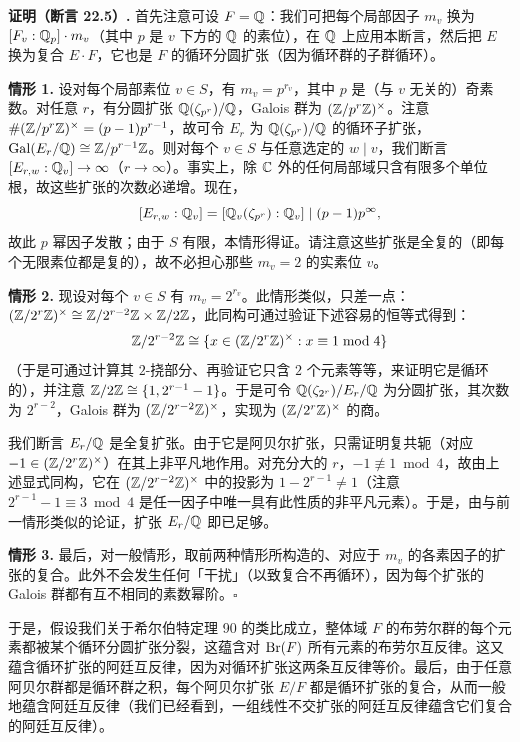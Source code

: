 \textbf{证明（断言 22.5）.} 首先注意可设 $F=\mathbb{Q}$：我们可把每个局部因子 $m_v$ 换为 $[F_v:\mathbb{Q}_p]\cdot m_v$（其中 $p$ 是 $v$ 下方的 $\mathbb{Q}$ 的素位），在 $\mathbb{Q}$ 上应用本断言，然后把 $E$ 换为复合 $E\cdot F$，它也是 $F$ 的循环分圆扩张（因为循环群的子群循环）。

\textbf{情形 1.} 设对每个局部素位 $v\in S$，有 $m_v=p^{r_v}$，其中 $p$ 是（与 $v$ 无关的）奇素数。对任意 $r$，有分圆扩张 $\mathbb{Q}(\zeta_{p^r})/\mathbb{Q}$，Galois 群为 $(\mathbb{Z}/p^r\mathbb{Z})^\times$。注意 $\#(\mathbb{Z}/p^r\mathbb{Z})^\times=(p-1)p^{r-1}$，故可令 $E_r$ 为 $\mathbb{Q}(\zeta_{p^r})/\mathbb{Q}$ 的循环子扩张，$\operatorname{Gal}(E_r/\mathbb{Q})\cong\mathbb{Z}/p^{r-1}\mathbb{Z}$。则对每个 $v\in S$ 与任意选定的 $w\mid v$，我们断言 $[E_{r,w}:\mathbb{Q}_v]\to\infty$（$r\to\infty$）。事实上，除 $\mathbb{C}$ 外的任何局部域只含有限多个单位根，故这些扩张的次数必递增。现在，
\[
[E_{r,w}:\mathbb{Q}_v]=[\mathbb{Q}_v(\zeta_{p^r}):\mathbb{Q}_v]\mid(p-1)p^\infty,
\]
故此 $p$ 幂因子发散；由于 $S$ 有限，本情形得证。请注意这些扩张是全复的（即每个无限素位都是复的），故不必担心那些 $m_v=2$ 的实素位 $v$。

\textbf{情形 2.} 现设对每个 $v\in S$ 有 $m_v=2^{r_v}$。此情形类似，只差一点：$(\mathbb{Z}/2^r\mathbb{Z})^\times\cong\mathbb{Z}/2^{r-2}\mathbb{Z}\times\mathbb{Z}/2\mathbb{Z}$，此同构可通过验证下述容易的恒等式得到：
\[
\mathbb{Z}/2^{r-2}\mathbb{Z}\cong\{x\in(\mathbb{Z}/2^r\mathbb{Z})^\times:x\equiv1\bmod4\}
\]
（于是可通过计算其 $2$-挠部分、再验证它只含 $2$ 个元素等等，来证明它是循环的），并注意 $\mathbb{Z}/2\mathbb{Z}\cong\{1,2^{r-1}-1\}$。于是可令 $\mathbb{Q}(\zeta_{2^r})/E_r/\mathbb{Q}$ 为分圆扩张，其次数为 $2^{r-2}$，Galois 群为 $(\mathbb{Z}/2^{r-2}\mathbb{Z})^\times$，实现为 $(\mathbb{Z}/2^r\mathbb{Z})^\times$ 的商。

我们断言 $E_r/\mathbb{Q}$ 是全复扩张。由于它是阿贝尔扩张，只需证明复共轭（对应 $-1\in(\mathbb{Z}/2^r\mathbb{Z})^\times$）在其上非平凡地作用。对充分大的 $r$，$-1\not\equiv1\bmod4$，故由上述显式同构，它在 $(\mathbb{Z}/2^{r-2}\mathbb{Z})^\times$ 中的投影为 $1-2^{r-1}\ne1$（注意 $2^{r-1}-1\equiv3\bmod4$ 是任一因子中唯一具有此性质的非平凡元素）。于是，由与前一情形类似的论证，扩张 $E_r/\mathbb{Q}$ 即已足够。

\textbf{情形 3.} 最后，对一般情形，取前两种情形所构造的、对应于 $m_v$ 的各素因子的扩张的复合。此外不会发生任何「干扰」（以致复合不再循环），因为每个扩张的 Galois 群都有互不相同的素数幂阶。\hfill$\square$

于是，假设我们关于希尔伯特定理 90 的类比成立，整体域 $F$ 的布劳尔群的每个元素都被某个循环分圆扩张分裂，这蕴含对 $\operatorname{Br}(F)$ 所有元素的布劳尔互反律。这又蕴含循环扩张的阿廷互反律，因为对循环扩张这两条互反律等价。最后，由于任意阿贝尔群都是循环群之积，每个阿贝尔扩张 $E/F$ 都是循环扩张的复合，从而一般地蕴含阿廷互反律（我们已经看到，一组线性不交扩张的阿廷互反律蕴含它们复合的阿廷互反律）。
